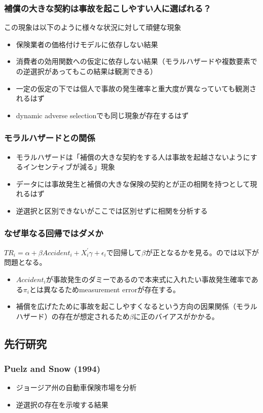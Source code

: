 \documentclass[dvipdfmx, 12pt]{beamer}
\begin{document}
\begin{frame}\frametitle{\small 補償の大きな契約は事故を起こしやすい人に選ばれる？}
この現象は以下のように様々な状況に対して頑健な現象
	\begin{itemize}
	\item 保険業者の価格付けモデルに依存しない結果
	\item 消費者の効用関数への仮定に依存しない結果（モラルハザードや複数要素での逆選択があってもこの結果は観測できる）
	\item 一定の仮定の下では個人で事故の発生確率と重大度が異なっていても観測されるはず
	\item dynamic adverse selectionでも同じ現象が存在するはず
	\end{itemize}
\end{frame}

\begin{frame}\frametitle{モラルハザードとの関係}
	\begin{itemize}
	\item モラルハザードは「補償の大きな契約をする人は事故を起越さないようにするインセンティブが減る」現象
	\item データには事故発生と補償の大きな保険の契約とが正の相関を持つとして現れるはず
	\item 逆選択と区別できないがここでは区別せずに相関を分析する
	\end{itemize}
\end{frame}

\begin{frame}\frametitle{なぜ単なる回帰ではダメか}
$TR_i = \alpha + \beta Accident_i + X_i^{'}\gamma + \epsilon_i$で回帰して$\beta$が正となるかを見る。のでは以下が問題となる。
	\begin{itemize}
	\item $Accident_i$が事故発生のダミーであるので本来式に入れたい事故発生確率である$\pi_i$とは異なるためmeasurement errorが存在する。
	\item 補償を広げたために事故を起こしやすくなるという方向の因果関係（モラルハザード）の存在が想定されるため$\beta$に正のバイアスがかかる。
	\end{itemize}
\end{frame}

\subsection{先行研究}
\begin{frame}\frametitle{Puelz and Snow (1994)}
	\begin{itemize}
	\item ジョージア州の自動車保険市場を分析
	\item 逆選択の存在を示唆する結果
	\end{itemize}
\end{frame}
\end{document}
